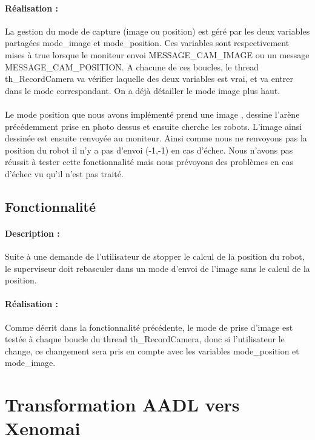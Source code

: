 \documentclass[11pt, a4paper]{paper}
\newcounter{cptreq}
\begin{document}
{{\paragraph{\color{black}Réalisation :}  {\color{black} La gestion du mode de capture (image ou position) est géré par les deux variables partagées mode\_image et mode\_position. Ces variables sont respectivement mises à true lorsque le moniteur envoi MESSAGE\_CAM\_IMAGE ou un message MESSAGE\_CAM\_POSITION. A chacune de ces boucles, le thread th\_RecordCamera va vérifier laquelle des deux variables est vrai, et va entrer dans le mode correspondant. On a déjà détailler le mode image plus haut.\\ \\
Le mode position que nous avons implémenté prend une image , dessine l'arène précédemment prise en photo dessus et ensuite cherche les robots. L'image ainsi dessinée est ensuite renvoyée au moniteur. Ainsi comme nous ne renvoyons pas la position du robot il n'y a pas d'envoi (-1,-1) en cas d'échec. Nous n'avons pas réussit à tester cette fonctionnalité mais nous prévoyons des problèmes en cas d'échec vu qu'il n'est pas traité.}
\subsection{Fonctionnalité \thecptreq}

\paragraph{Description :} Suite à une demande de l'utilisateur de stopper le calcul de la position du robot, le superviseur doit rebasculer dans un mode d'envoi de l'image sans le calcul de la position.

\paragraph{\color{black}Réalisation :}  {\color{black} Comme décrit dans la fonctionnalité précédente, le mode de prise d'image est testée à chaque boucle du thread th\_RecordCamera, donc si l'utilisateur le change, ce changement sera pris en compte avec les variables mode\_position et mode\_image. }


\section{Transformation AADL vers Xenomai}
 
}}
\end{document}
